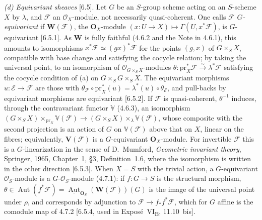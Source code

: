 \par\smallskip\noindent\textit{(d) Equivariant sheaves} [6.5].
Let \(G\) be an \(S\)-group scheme acting on an \(S\)-scheme \(X\) by
\(\lambda\), and \(\mathscr F\) an \(\mathcal O_X\)-module, not necessarily
quasi-coherent. One calls \(\mathscr F\) \emph{\(G\)-equivariant} if
\(\mathbf W(\mathscr F)\), the \(\mathbf O_X\)-module
\((x:U\to X)\mapsto\Gamma(U,x^*\mathscr F)\), is \(G\)-equivariant [6.5.1].
As \(\mathbf W\) is fully faithful (4.6.2 and the Note in 4.6.1), this
amounts to isomorphisms \(x^*\mathscr F\simeq(gx)^*\mathscr F\) for the
points \((g,x)\) of \(G\times_SX\), compatible with base change and
satisfying the cocycle relation; by taking the universal point, to an
isomorphism of \(\mathcal O_{G\times_SX}\)-modules
\(\theta:\mathrm{pr}_X^*\mathscr F\xrightarrow{\sim}\lambda^*\mathscr F\)
satisfying the cocycle condition of (a) on \(G\times_SG\times_SX\). The
equivariant morphisms \(u:\mathscr E\to\mathscr F\) are those with
\(\theta_{\mathscr F}\circ\mathrm{pr}_X^*(u)=\lambda^*(u)\circ\theta_{\mathscr E}\),
and pull-backs by equivariant morphisms are equivariant [6.5.2]. If
\(\mathscr F\) is quasi-coherent, \(\theta^{-1}\) induces, through the
contravariant functor \(\mathbb V\) (4.6.3), an isomorphism
\((G\times_SX)\times_{\mathrm{pr}_X}\mathbb V(\mathscr F)\to(G\times_SX)\times_\lambda\mathbb V(\mathscr F)\),
whose composite with the second projection is an action of \(G\) on
\(\mathbb V(\mathscr F)\) above that on \(X\), linear on the fibres;
equivalently, \(\mathbf V(\mathscr F)\) is a \(G\)-equivariant
\(\mathbf O_X\)-module. For invertible \(\mathscr F\) this is a
\(G\)-linearization in the sense of D.~Mumford, \textit{Geometric invariant
theory}, Springer, 1965, Chapter~1, \S3, Definition~1.6, where the
isomorphism is written in the other direction [6.5.3].
When \(X=S\) with the trivial action,
a \(G\)-equivariant \(\mathcal O_S\)-module is a
\(G\)-\(\mathcal O_S\)-module (4.7.1): if \(f:G\to S\) is the structural
morphism, \(\theta\in\operatorname{Aut}(f^*\mathscr F)
=\underline{\operatorname{Aut}}_{\mathbf O_S}(\mathbf W(\mathscr F))(G)\) is
the image of the universal point under \(\rho\), and corresponds by
adjunction to \(\mathscr F\to f_*f^*\mathscr F\), which for \(G\) affine is
the comodule map of 4.7.2 [6.5.4, used in Exposé~VI\textsubscript{B},
11.10~bis].

